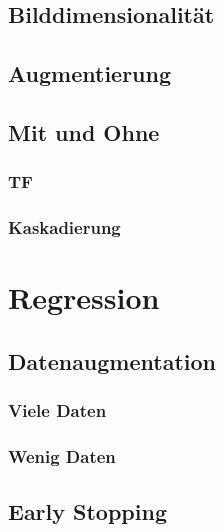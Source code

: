 \documentclass[ngerman]{report}
\begin{document}
    \section{Bilddimensionalität}
    
    \section{Augmentierung}
    
    \section{Mit und Ohne}
    \subsection{TF}
    
    \subsection{Kaskadierung}
    


    \chapter{Regression}  %
    
    \section{Datenaugmentation}
    
    \subsection{Viele Daten}
    
    \subsection{Wenig Daten}
    
    \section{Early Stopping}
    
    
\end{document}
